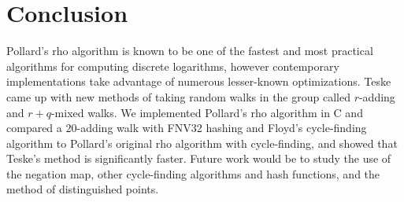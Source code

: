 \documentclass{article}
\newcommand{\ZZ}{\mathbb{Z}}
\newcommand{\NN}{\mathbb{N}}
\newtheorem{defn}[thm]{Definition}
\begin{document}
\iffalse
\begin{defn}
	Let $G$ be a finite cyclic group and $g,h,y \in G$. An \textbf{iterating function} on $G$ is a function $F: G \to G$ such that for any $\alpha,\beta \in \NN_0$ such that $y=g^\alpha h^\beta$ we can efficiently compute $\alpha', \beta' \in \NN_0$ such that $F(y)=g^{\alpha'} h^{\beta'}$.
\end{defn}


\begin{defn}
	Let $G$ be a finite cyclic group, $n \in \NN$, and $M_0, M_1, \ldots, M_{n-1}$ be elements of $G$. Furthermore, let $P$ be a hash function from $G$ to $\ZZ_n$ and $F$ be an iterating function on $G$. A walk $(Y_k)$ with $F$ is called \textbf{$r$-adding} if $F$ is of the form $F(Y) = Y * M_{P(Y)}$ for all $Y \in G$.
\end{defn}
\fi

\section{Conclusion}

Pollard's rho algorithm is known to be one of the fastest and most practical algorithms for computing discrete logarithms, however contemporary implementations take advantage of numerous lesser-known optimizations. Teske came up with new methods of taking random walks in the group called $r$-adding and $r+q$-mixed walks. We implemented Pollard's rho algorithm in C and compared a $20$-adding walk with FNV32 hashing and Floyd's cycle-finding algorithm to Pollard's original rho algorithm with cycle-finding, and showed that Teske's method is significantly faster. Future work would be to study the use of the negation map, other cycle-finding algorithms and hash functions, and the method of distinguished points.

\printbibliography
\end{document}
